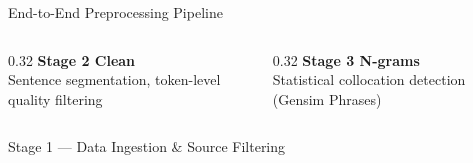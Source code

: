 \documentclass[11pt,aspectratio=169,professionalfonts]{beamer}
\begin{document}
\begin{frame}{End-to-End Preprocessing Pipeline}
\begin{columns}[T]
  \begin{column}{0.32\textwidth}
    \centering\footnotesize
    \textbf{Stage 2 \textemdash{} Clean}\\
    Sentence segmentation, token-level quality filtering
  \end{column}

  \begin{column}{0.32\textwidth}
    \centering\footnotesize
    \textbf{Stage 3 \textemdash{} N-grams}\\
    Statistical collocation detection (Gensim Phrases)
  \end{column}
\end{columns}

\end{frame}
%
%
\begin{frame}[fragile]{Stage 1 — Data Ingestion \& Source Filtering}


\end{frame}
\end{document}
